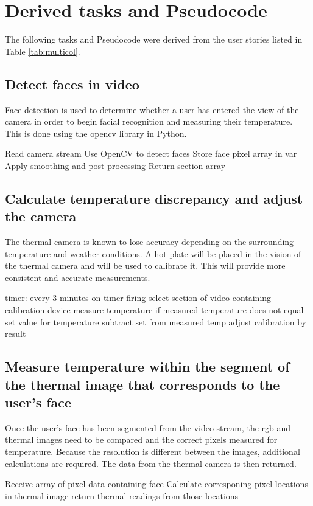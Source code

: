\documentclass[12pt, letterpaper]{article}
\begin{document}
    \section{Derived tasks and Pseudocode}
    The following tasks and Pseudocode were derived from the user stories listed in Table \ref{tab:multicol}.
    \subsection{Detect faces in video}
    Face detection is used to determine whether a user has entered the view of the camera in order to 
    begin facial recognition and measuring their temperature. This is done using the opencv library in 
    Python.
    \begin{algorithm}
        Read camera stream
        Use OpenCV to detect faces
        Store face pixel array in var
        Apply smoothing and post processing
        Return section array
    \end{algorithm}
    \subsection{Calculate temperature discrepancy and adjust the camera}
    The thermal camera is known to lose accuracy depending on the surrounding temperature and weather 
    conditions. A hot plate will be placed in the vision of the thermal camera and will be used to 
    calibrate it. This will provide more consistent and accurate measurements.
    \begin{algorithm}[caption={Thermal cam calibration.}, label={alg1}]
        timer: every 3 minutes
        on timer firing
            select section of video containing calibration device
            measure temperature
            if measured temperature does not equal set value for temperature
                subtract set from measured temp
                adjust calibration by result
    \end{algorithm}
    \subsection{Measure temperature within the segment of the thermal image that corresponds to the user’s face}
    Once the user's face has been segmented from the video stream, the rgb and thermal images need to be 
    compared and the correct pixels measured for temperature.  Because the resolution is different between the images,
    additional calculations are required. The data from the thermal camera is then returned.
    \begin{algorithm}[caption={Temperatur reading.}, label={alg1}]
        Receive array of pixel data containing face
        Calculate corresponing pixel locations in thermal image
        return thermal readings from those locations
    \end{algorithm}
\end{document}

